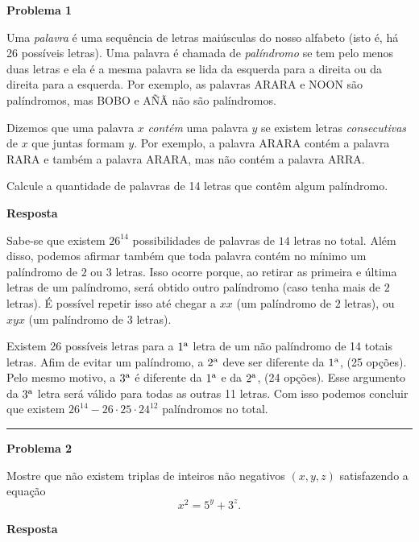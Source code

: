 \documentclass{article}
\begin{document}
  {\centering \textbf{Problema 1} \par}
  Uma \textit{palavra} é uma sequência de letras maiúsculas do
  nosso alfabeto (isto é, há 26 possíveis letras). Uma palavra é chamada de
  \textit{palíndromo} se tem pelo menos duas letras e ela é a mesma palavra se lida da
  esquerda para a direita ou da direita para a esquerda. Por exemplo, as palavras ARARA
  e NOON são palíndromos, mas BOBO e AÑÃ não são palíndromos.

  Dizemos que uma palavra $x$ \textit{contém} uma palavra $y$ se existem letras
  \textit{consecutivas} de $x$ que juntas formam $y$. Por exemplo, a palavra ARARA
  contém a palavra RARA e também a palavra ARARA, mas não contém a palavra ARRA.

  Calcule a quantidade de palavras de 14 letras que contêm algum palíndromo.

  \medskip

  {\centering \textbf{Resposta} \par}
  Sabe-se que existem \(26^{14}\) possibilidades de palavras de \(14\) letras no total. Além disso, podemos afirmar também que toda palavra contém no mínimo um palíndromo de $2$ ou $3$ letras.
  Isso ocorre porque, ao retirar as primeira e última letras de um palíndromo, será obtido outro palíndromo (caso tenha mais de $2$ letras). É possível repetir isso até chegar
  a $xx$ (um palíndromo de $2$ letras), ou $xyx$ (um palíndromo de $3$ letras).
  
  Existem 26 possíveis letras para a \(1\textsuperscript{a}\) letra de um não palíndromo de 14 totais letras. Afim de evitar um palíndromo, a \(2\textsuperscript{a}\)
  deve ser diferente da \(1\textsuperscript{a}\), (25 opções). Pelo mesmo motivo, a \(3\textsuperscript{a}\) é diferente da \(1\textsuperscript{a}\) e da \(2\textsuperscript{a}\),
  (24 opções). Esse argumento da \(3\textsuperscript{a}\) letra será válido para todas as outras 11 letras. Com isso podemos concluir que existem \(26^{14} - 26 \cdot 25 \cdot 24^{12}\)
  palíndromos no total.


  \noindent\rule{\linewidth}{0.4pt}
  {\centering \textbf{Problema 2} \par}
  Mostre que não existem triplas de inteiros não negativos
  $(x, y, z)$ satisfazendo a equação
  \[
    x^2 = 5^y + 3^z.
  \]
  \medskip

  {\centering \textbf{Resposta} \par}
\end{document}
